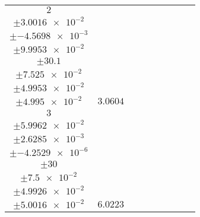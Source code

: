 \documentclass[8pt]{article}
\begin{document}
\begin{longtable}[l]{c c c c c c c c c}
$\num{2}$ & \begin{tabular}[c]{@{}c@{}}$\num{3.0016}$ \\ $\pm\num{3.0016e-2}$\end{tabular} & \begin{tabular}[c]{@{}c@{}}$\num{-0.45698}$ \\ $\pm\num{-4.5698e-3}$\end{tabular} & \begin{tabular}[c]{@{}c@{}}$\num{9.9953}$ \\ $\pm\num{9.9953e-2}$\end{tabular} & \begin{tabular}[c]{@{}c@{}}$\num{3.01e+3}$ \\ $\pm\num{30.1}$\end{tabular} & \begin{tabular}[c]{@{}c@{}}$\num{7.525}$ \\ $\pm\num{7.525e-2}$\end{tabular} & \begin{tabular}[c]{@{}c@{}}$\num{4.9953}$ \\ $\pm\num{4.9953e-2}$\end{tabular} & \begin{tabular}[c]{@{}c@{}}$\num{4.995}$ \\ $\pm\num{4.995e-2}$\end{tabular} & $\num{3.0604}$\\
$\num{3}$ & \begin{tabular}[c]{@{}c@{}}$\num{5.9962}$ \\ $\pm\num{5.9962e-2}$\end{tabular} & \begin{tabular}[c]{@{}c@{}}$\num{0.26285}$ \\ $\pm\num{2.6285e-3}$\end{tabular} & \begin{tabular}[c]{@{}c@{}}$\num{-4.2529e-4}$ \\ $\pm\num{-4.2529e-6}$\end{tabular} & \begin{tabular}[c]{@{}c@{}}$\num{3e+3}$ \\ $\pm\num{30}$\end{tabular} & \begin{tabular}[c]{@{}c@{}}$\num{7.5}$ \\ $\pm\num{7.5e-2}$\end{tabular} & \begin{tabular}[c]{@{}c@{}}$\num{4.9926}$ \\ $\pm\num{4.9926e-2}$\end{tabular} & \begin{tabular}[c]{@{}c@{}}$\num{5.0016}$ \\ $\pm\num{5.0016e-2}$\end{tabular} & $\num{6.0223}$\\

\end{longtable}
\end{document}
